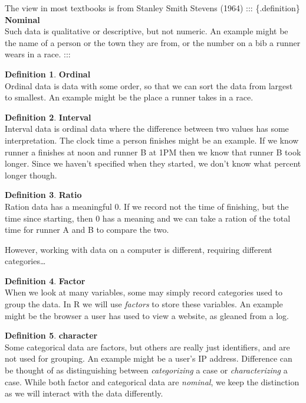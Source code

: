 \documentclass[
]{book}
\theoremstyle{definition}
\newtheorem{definition}{Definition}[chapter]
\theoremstyle{definition}
\theoremstyle{definition}
\theoremstyle{definition}
\theoremstyle{remark}
\begin{document}
The view in most textbooks is from Stanley Smith Stevens (1964)
::: \{.definition\}
\textbf{Nominal}\\
Such data is qualitative or descriptive, but not numeric. An example might be the name of a person or the town they are from, or the number on a bib a runner wears in a race.
:::

\begin{definition}
\textbf{Ordinal}\\
Ordinal data is data with some order, so that we can sort the data from largest to smallest. An example might be the place a runner takes in a race.
\end{definition}

\begin{definition}
\textbf{Interval}\\
Interval data is ordinal data where the difference between two values has some interpretation. The clock time a person finishes might be an example. If we know runner a finishes at noon and runner B at 1PM then we know that runner B took longer. Since we haven't specified when they started, we don't know what percent longer though.
\end{definition}

\begin{definition}
\textbf{Ratio}\\
Ration data has a meaningful 0. If we record not the time of finishing, but the time since starting, then 0 has a meaning and we can take a ration of the total time for runner A and B to compare the two.
\end{definition}

However, working with data on a computer is different, requiring different categories\ldots{}

\begin{definition}
\textbf{Factor}\\
When we look at many variables, some may simply record categories used to group the data. In R we will use \emph{factors} to store these variables. An example might be the browser a user has used to view a website, as gleaned from a log.
\end{definition}

\begin{definition}
\textbf{character}\\
Some categorical data are factors, but others are really just identifiers, and are not used for grouping. An example might be a user's IP address. Difference can be thought of as distinguishing between \emph{categorizing} a case or \emph{characterizing} a case. While both factor and categorical data are \emph{nominal}, we keep the distinction as we will interact with the data differently.
\end{definition}
\end{document}
